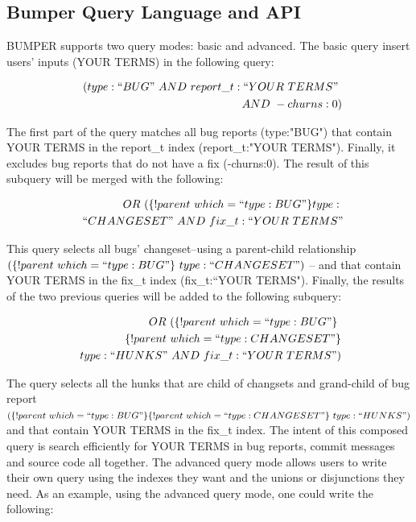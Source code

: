 \documentclass[conference]{IEEEtran}
\begin{document}
\subsection{Bumper Query Language and API}
\label{sub:Bumper Query Language and API}

BUMPER supports two query modes: basic and advanced.
The basic query insert users' inputs (YOUR TERMS) in the
following query:

\begin{equation*}
\begin{split}
~~(type:``BUG"~AND~report\_t:``YOUR~TERMS"~\\
~~AND~-churns:0)
\end{split}
\end{equation*}



The first part of the query matches all bug reports
(type:"BUG") that contain YOUR TERMS in the report\_t index
(report\_t:"YOUR TERMS").
Finally, it excludes bug reports that
do not have a fix (-churns:0).
The result of this subquery will be
merged with the following:

\begin{equation*}
\begin{split}
~~OR~(\{!parent~which=``type:BUG"\}type:~\\
~~``CHANGESET"~AND~fix\_t:``YOUR~TERMS"
\end{split}
\end{equation*}

This query selects all bugs' changeset--using a parent-child
relationship $(\{!parent~which=``type:BUG"\}~type:
  ``CHANGESET")$ -- and that contain YOUR TERMS in the fix\_t
  index (fix\_t:``YOUR TERMS").
Finally, the results of the two
previous queries will be added to the following subquery:

\begin{equation*}
\begin{split}
  OR~(\{!parent~which=``type:BUG"\}\ \\
~\{!parent~which=``type:CHANGESET"\}\\
~type:``HUNKS"~AND~fix\_t:``YOUR~TERMS")
\end{split}
\end{equation*}

The query selects all the hunks that are child of changsets and
grand-child of bug report $ (\{!parent~which=``type:BUG"\}
  \{!parent~which=``type:CHANGESET"\}~type:``HUNKS")$
and that
contain YOUR TERMS in the fix\_t index.
The intent of this composed query is search efficiently for
YOUR TERMS in bug reports, commit messages and source
code all together.
The advanced query mode allows users to write their own
query using the indexes they want and the unions or disjunctions
they need.
As an example, using the advanced query mode, one
could write the following:
\end{document}
